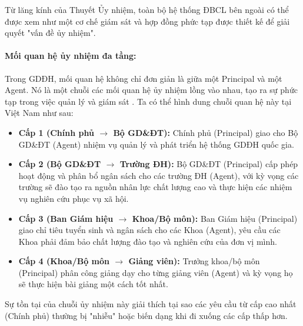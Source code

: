 \documentclass[12pt, a4paper, openany]{report}
\begin{document}
Từ lăng kính của Thuyết Ủy nhiệm, toàn bộ hệ thống ĐBCL bên ngoài có thể được xem như một cơ chế giám sát và hợp đồng phức tạp được thiết kế để giải quyết "vấn đề ủy nhiệm".

\paragraph{Mối quan hệ ủy nhiệm đa tầng:}
Trong GDĐH, mối quan hệ không chỉ đơn giản là giữa một Principal và một Agent. Nó là một chuỗi các mối quan hệ ủy nhiệm lồng vào nhau, tạo ra sự phức tạp trong việc quản lý và giám sát \cite{Borgos2013}. Ta có thể hình dung chuỗi quan hệ này tại Việt Nam như sau:
\begin{itemize}
    \item \textbf{Cấp 1 (Chính phủ $\rightarrow$ Bộ GD\&ĐT):} Chính phủ (Principal) giao cho Bộ GD\&ĐT (Agent) nhiệm vụ quản lý và phát triển hệ thống GDĐH quốc gia.
    \item \textbf{Cấp 2 (Bộ GD\&ĐT $\rightarrow$ Trường ĐH):} Bộ GD\&ĐT (Principal) cấp phép hoạt động và phân bổ ngân sách cho các trường ĐH (Agent), với kỳ vọng các trường sẽ đào tạo ra nguồn nhân lực chất lượng cao và thực hiện các nhiệm vụ nghiên cứu phục vụ xã hội.
    \item \textbf{Cấp 3 (Ban Giám hiệu $\rightarrow$ Khoa/Bộ môn):} Ban Giám hiệu (Principal) giao chỉ tiêu tuyển sinh và ngân sách cho các Khoa (Agent), yêu cầu các Khoa phải đảm bảo chất lượng đào tạo và nghiên cứu của đơn vị mình.
    \item \textbf{Cấp 4 (Khoa/Bộ môn $\rightarrow$ Giảng viên):} Trưởng khoa/bộ môn (Principal) phân công giảng dạy cho từng giảng viên (Agent) và kỳ vọng họ sẽ thực hiện bài giảng một cách tốt nhất.
\end{itemize}
Sự tồn tại của chuỗi ủy nhiệm này giải thích tại sao các yêu cầu từ cấp cao nhất (Chính phủ) thường bị "nhiễu" hoặc biến dạng khi đi xuống các cấp thấp hơn.
\end{document}
